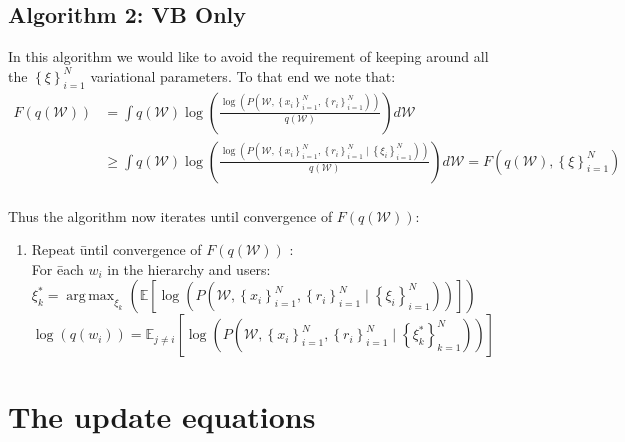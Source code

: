 \documentclass[11pt, a4paper]{article}
\DeclareMathOperator*{\argmax}{arg\,max}
\def\>{ \right\rangle }
\begin{document}
\subsection{Algorithm 2: VB Only}

 In this algorithm we would like to avoid the requirement of keeping around all the $\left\{\xi\right\}_{i=1}^N$ variational parameters. To that end we note that:
 \begin{align*}
 F\left(q(\mathcal{W})\right)&=\int q(\mathcal{W})\log\left(\frac{\log\left(P\left(\mathcal{W},\left\{x_i\right\}_{i=1}^N,\left\{r_i\right\}_{i=1}^N \right)\right)}{q(\mathcal{W})} \right) d\mathcal{W} \\&\geq \int q(\mathcal{W})\log\left(\frac{\log\left(P\left(\mathcal{W},\left\{x_i\right\}_{i=1}^N,\left\{r_i\right\}_{i=1}^N \mid \left\{\xi_i\right\}_{i=1}^N\right)\right)}{q(\mathcal{W})} \right) d\mathcal{W}=F\left(q(\mathcal{W}),\left\{\xi\right\}_{i=1}^N\right)\\\end{align*}

Thus the algorithm now iterates until convergence of $ F\left(q(\mathcal{W})\right)$:
\begin{enumerate}
                                   \item \begin{tabbing}
Repeat \= until convergence of $F\left(q(\mathcal{W})\right)$ : \\
\>For \=each $w_i$ in the hierarchy and users:\\
\>\>$\xi^*_k= \argmax_{\xi_k}\left(\mathbb{E} \left[\log\left(P\left(\mathcal{W},\left\{x_i\right\}_{i=1}^N,\left\{r_i\right\}_{i=1}^N \mid \left\{\xi_i\right\}_{i=1}^N\right)\right)\right]\right)$ \\
\>\>$\log\left(q(w_i)\right)=\mathbb{E}_{j\neq i} \left[\log\left(P\left(\mathcal{W},\left\{x_i\right\}_{i=1}^N,\left\{r_i\right\}_{i=1}^N \mid \left\{\xi^*_k\right\}_{k=1}^N\right)\right)\right]$\\

\end{tabbing}

\end{enumerate}


\section{The update equations}
\end{document}
